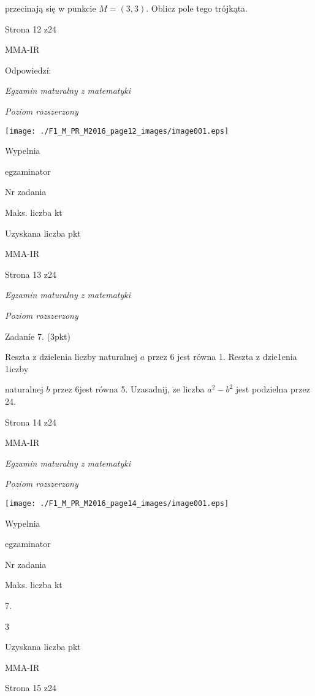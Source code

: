 \documentclass[a4paper,12pt]{article}
\begin{document}
przecinają się w punkcie $M=(3,3)$. Oblicz pole tego trójkąta.

Strona 12 z24

MMA-IR





Odpowiedzí:

{\it Egzamin maturalny z matematyki}

{\it Poziom rozszerzony}
\begin{center}
\texttt{[image: ./F1\_M\_PR\_M2016\_page12\_images/image001.eps]}
\end{center}
Wypelnia

egzaminator

Nr zadania

Maks. liczba kt

Uzyskana liczba pkt

MMA-IR

Strona 13 z24





{\it Egzamin maturalny z matematyki}

{\it Poziom rozszerzony}

Zadaníe 7. (3pkt)

Reszta z dzielenia liczby naturalnej $a$ przez 6 jest równa 1. Reszta z dzie1enia 1iczby

naturalnej $b$ przez $6$jest równa 5. Uzasadnij, $\dot{\mathrm{z}}\mathrm{e}$ liczba $a^{2}-b^{2}$ jest podzielna przez 24.

Strona 14 z24

MMA-IR





{\it Egzamin maturalny z matematyki}

{\it Poziom rozszerzony}
\begin{center}
\texttt{[image: ./F1\_M\_PR\_M2016\_page14\_images/image001.eps]}
\end{center}
Wypelnia

egzaminator

Nr zadania

Maks. liczba kt

7.

3

Uzyskana liczba pkt

MMA-IR

Strona 15 z24
\end{document}
